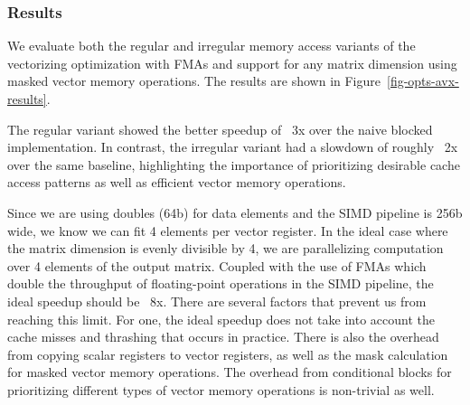 \subsubsection{Results}


We evaluate both the regular and irregular memory access variants of the
vectorizing optimization with FMAs and support for any matrix dimension
using masked vector memory operations. The results are shown in
Figure~\ref{fig-opts-avx-results}.
\smallskip

The regular variant showed the better speedup of ~3x over the naive
blocked implementation. In contrast, the irregular variant had a slowdown
of roughly ~2x over the same baseline, highlighting the importance of
prioritizing desirable cache access patterns as well as efficient vector
memory operations.
\smallskip

Since we are using doubles (64b) for data elements and the SIMD pipeline
is 256b wide, we know we can fit 4 elements per vector register. In the
ideal case where the matrix dimension is evenly divisible by 4, we are
parallelizing computation over 4 elements of the output matrix. Coupled
with the use of FMAs which double the throughput of floating-point
operations in the SIMD pipeline, the ideal speedup should be ~8x. There
are several factors that prevent us from reaching this limit. For one,
the ideal speedup does not take into account the cache misses and
thrashing that occurs in practice. There is also the overhead from
copying scalar registers to vector registers, as well as the mask
calculation for masked vector memory operations. The overhead from
conditional blocks for prioritizing different types of vector memory
operations is non-trivial as well.

\clearpage
